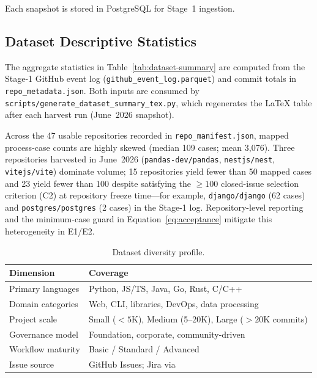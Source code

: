 Each snapshot is stored in PostgreSQL for Stage~1 ingestion.


\subsection{Dataset Descriptive Statistics}
\label{sec:dataset-stats}

The aggregate statistics in Table~\ref{tab:dataset-summary} are computed from
the Stage-1 GitHub event log (\texttt{github\_event\_log.parquet}) and commit
totals in \texttt{repo\_metadata.json}. Both inputs are consumed by
\texttt{scripts/generate\_dataset\_summary\_tex.py}, which regenerates the
LaTeX table after each harvest run (June~2026 snapshot).



Across the 47 usable repositories recorded in \texttt{repo\_manifest.json},
mapped process-case counts are highly skewed (median 109 cases; mean
3{,}076). Three repositories harvested in June~2026
(\texttt{pandas-dev/pandas}, \texttt{nestjs/nest}, \texttt{vitejs/vite})
dominate volume; 15 repositories yield fewer than 50 mapped cases and 23
yield fewer than 100 despite satisfying the $\geq 100$ closed-issue
selection criterion (C2) at repository freeze time---for example,
\texttt{django/django} (62 cases) and \texttt{postgres/postgres} (2 cases)
in the Stage-1 log. Repository-level reporting and the minimum-case guard in
Equation~\eqref{eq:acceptance} mitigate this heterogeneity in E1/E2.

\begin{table}[htbp]
\centering
\caption{Dataset diversity profile.}
\label{tab:dataset-diversity}
\begin{tabular}{ll}
\toprule
\textbf{Dimension} & \textbf{Coverage} \\
\midrule
Primary languages   & Python, JS/TS, Java, Go, Rust, C/C++ \\
Domain categories   & Web, CLI, libraries, DevOps, data processing \\
Project scale       & Small ($<5$K), Medium (5--20K), Large ($>20$K commits) \\
Governance model    & Foundation, corporate, community-driven \\
Workflow maturity   & Basic / Standard / Advanced \\
Issue source        & GitHub Issues; Jira via~\cite{montgomery2022jira} \\
\bottomrule
\end{tabular}
\end{table}


